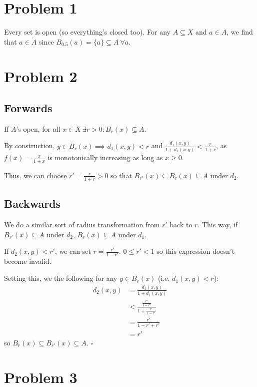 \documentclass[12pt]{article}
\begin{document}
\section{Problem 1}

Every set is open (so everything's closed too).
For any $A \subseteq X$ and $a \in A$, we find that
$a \in \mathring{A}$ since $B_{0.5}(a)=\{a\} \subseteq A\ \forall a$.

\section{Problem 2}\label{sec:p2}

\subsection{Forwards}

If $A$'s open, for all $x \in X\ \exists r > 0: B_r(x) \subseteq A$.

By construction, $y \in B_r(x) \implies d_1(x, y) < r$ and $\frac{d_1(x, y)}{1+d_1(x, y)} < \frac{r}{1+r}$,
as $f(x)=\frac{x}{1+x}$ is monotonically increasing as long as $x \ge 0$.

Thus, we can choose $r'=\frac{r}{1+r}>0$ so that $B_{r'}(x) \subseteq B_r(x) \subseteq A$ under $d_2$.

\subsection{Backwards}

We do a similar sort of radius transformation from $r'$ back to $r$.
This way, if $B_{r'}(x) \subseteq A$ under $d_2$, $B_r(x) \subseteq A$ under $d_1$.

If $d_2(x,y) < r'$, we can set $r=\frac{r'}{1-r'}$.
$0 \le r' < 1$ so this expression doesn't become invalid.

Setting this, we the following for any $y \in B_r(x)$ (i.e. $d_1(x, y) < r$):
\begin{align*}
  d_2(x,y)
   & = \frac{d_1(x,y)}{1+d_1(x,y)}               \\
   & < \frac{\frac{r'}{1-r'}}{1+\frac{r'}{1-r'}} \\
   & = \frac{r'}{1-r'+r'}                        \\
   & = r'
\end{align*}
so $B_r(x) \subseteq B_{r'}(x) \subseteq A$. $\square$

\pagebreak

\section{Problem 3}
\end{document}
